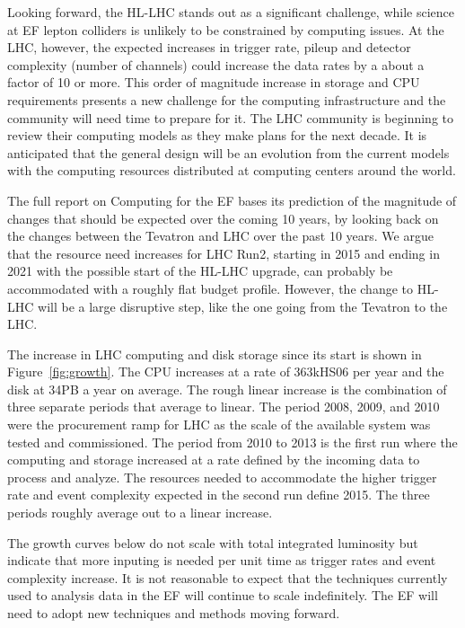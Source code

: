 Looking forward, the HL-LHC stands out as a significant challenge, while
science at EF lepton colliders is unlikely to be constrained by
computing issues. 
At the LHC, however, the expected increases in trigger rate, pileup and detector
complexity (number of channels) could increase the data rates by a about a
factor of 10 or more.   This order of magnitude increase in storage and CPU
requirements presents a new challenge for the computing infrastructure and the
community will need time to prepare for it. The LHC community is beginning to
review their computing models as they make plans for the next decade.  It is
anticipated that the general design will be an evolution from the current
models with the computing resources distributed at computing centers around
the world.

The full report on Computing for the EF bases its 
prediction of the magnitude of
changes that should be expected over the coming 10 years, by looking back on 
the changes between the Tevatron and LHC over the past 10 years. We argue that 
the resource need increases for LHC Run2, starting in 2015 and ending 
in 2021 with the possible start of  the HL-LHC upgrade, can probably be 
accommodated with a roughly flat budget profile. However, the change to HL-LHC
will be a large disruptive step, like the one going from the Tevatron to the LHC. 

The increase in LHC computing and disk storage since its start is shown in
Figure~\ref{fig:growth}.  The CPU increases at a rate of 363kHS06 per
year and the disk at 34PB a year on average.  The rough linear
increase is the combination of three separate periods that average to
linear.  The period 2008, 2009, and 2010 were the procurement ramp for
LHC as the scale of the available system was tested and commissioned.
The period from 2010 to 2013 is the first run where the computing and
storage increased at a rate defined by the incoming data to process
and analyze.  The resources needed to accommodate the higher trigger
rate and event complexity expected in the second run define 2015.  The
three periods roughly average out to a linear increase.

The growth curves below do not scale
with total integrated luminosity but indicate that more inputing is
needed per unit time as trigger rates and event complexity increase.
It is not reasonable to expect that the techniques currently used to
analysis data in the EF will continue to scale
indefinitely.  The EF will need to adopt new techniques
and methods moving forward.

